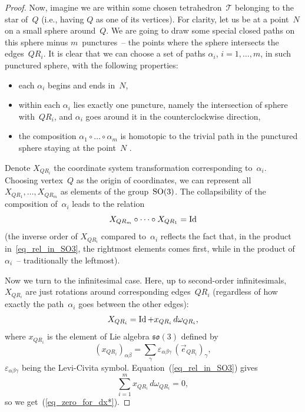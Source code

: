 \begin{proof}
Now, imagine we are within some chosen tetrahedron~$\mathcal T$ belonging to the star of~$Q$ (i.e., having $Q$ as one of its vertices). For clarity, let us be at a point~$N$ on a small sphere around~$Q$. We are going to draw some special closed paths on this sphere minus $m$~punctures~-- the points where the sphere intersects the edges~$QR_i$. It is clear that we can choose a set of paths $\alpha_i$, $i=1,\dots,m$, in such punctured sphere, with the following properties:
\begin{itemize}
\itemsep=0pt
	\item each $\alpha_i$ begins and ends in~$N$,
	\item within each $\alpha_i$ lies exactly one puncture, namely the intersection of sphere with~$QR_i$, and $\alpha_i$ goes around it in the counterclockwise direction,
	\item the composition $\alpha_1 \circ \dots \circ \alpha_m$ is homotopic to the trivial path in the punctured sphere staying at the point~$N$ .	
\end{itemize}

Denote $X_{QR_i}$ the coordinate system transformation corresponding to~$\alpha_i$. Choosing vertex~$Q$ as the origin of coordinates, we can represent all $X_{QR_1}, \ldots, X_{QR_m}$ as elements of the group~${\rm SO}(3)$. The collapsibility of the composition of~$\alpha_i$ leads to the relation
\begin{equation}
X_{QR_m} \circ \dots \circ X_{QR_1} = \mathop{\rm Id}
\label{eq_rel_in_SO3}
\end{equation}
(the inverse order of $X_{QR_i}$ compared to~$\alpha_i$ ref\/lects the fact that, in the product in~\eqref{eq_rel_in_SO3}, the rightmost elements comes f\/irst, while in the product of~$\alpha_i$~-- traditionally the leftmost).

Now we turn to the inf\/initesimal case. Here, up to second-order inf\/initesimals, $X_{QR_i}$ are just rotations around corresponding edges~$QR_i$ (regardless of how exactly the path~$\alpha_i$ goes between the other edges):
\begin{displaymath}
X_{QR_i} = \mathop{\rm Id} + x_{QR_i}\, d\omega_{QR_i},
\end{displaymath}
where $x_{QR_i}$ is the element of Lie algebra $\mathfrak{so}(3)$ def\/ined by
\begin{displaymath}
(x_{QR_i})_{\alpha\beta} = \sum\limits_\gamma\varepsilon_{\alpha\beta\gamma}\, (\vec e_{QR_i})_\gamma ,
\end{displaymath}
$\varepsilon_{\alpha\beta\gamma}$ being the Levi-Civita symbol.
Equation~(\ref{eq_rel_in_SO3}) gives
\begin{displaymath}
\sum_{i=1}^m x_{QR_i}\, d\omega_{QR_i} = 0 ,
\end{displaymath}
so we get~(\ref{eq_zero_for_dx*}).
\end{proof}


